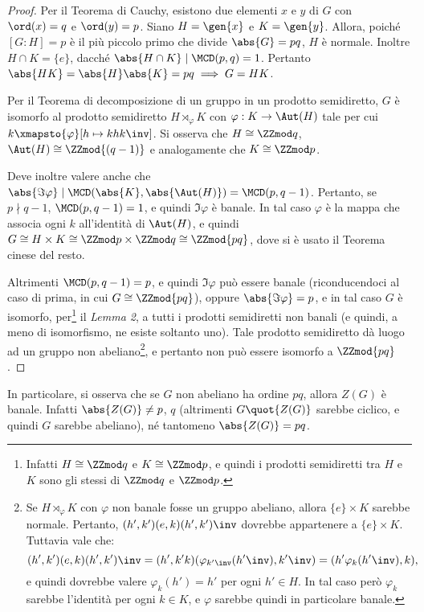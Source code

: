 \documentclass[12pt]{scrartcl}
\begin{document}
	\begin{proof}
		Per il Teorema di Cauchy, esistono due elementi $x$ e $y$ di $G$ con $\ord(x)=q$
		e $\ord(y)=p$. Siano $H = \gen{x}$ e $K = \gen{y}$. Allora, poiché $[G : H] = p$
		è il più piccolo primo che divide $\abs{G} = pq$, $H$ è normale. Inoltre
		$H \cap K = \{e\}$, dacché $\abs{H \cap K} \mid \MCD(p, q) = 1$. Pertanto
		$\abs{HK} = \abs{H} \abs{K} = pq \implies G = HK$. \medskip
		
		
		Per il Teorema di decomposizione di un gruppo in un prodotto semidiretto,
		$G$ è isomorfo al prodotto semidiretto $H \rtimes_\varphi K$ con
		$\varphi : K \to \Aut(H)$ tale per cui $k \xmapsto{\varphi} [h \mapsto k h k\inv]$.
		Si osserva che $H \cong \ZZmod q$, $\Aut(H) \cong \ZZmod{(q-1)}$ e analogamente che
		$K \cong \ZZmod p$. \medskip
		
		
		Deve inoltre valere anche che $\abs{\Im \varphi} \mid \MCD(\abs{K},
		\abs{\Aut(H)}) = \MCD(p, q-1)$. Pertanto, se $p \nmid q-1$, $\MCD(p, q-1) = 1$,
		e quindi $\Im \varphi$ è banale. In tal caso $\varphi$ è la mappa che associa
		ogni $k$ all'identità di $\Aut(H)$, e quindi $G \cong H \times K \cong \ZZmod p \times \ZZmod q \cong \ZZmod{pq}$, dove si è usato il Teorema cinese del resto. \medskip
		
		
		Altrimenti $\MCD(p, q-1) = p$, e quindi $\Im \varphi$ può essere banale (riconducendoci
		al caso di prima, in cui $G \cong \ZZmod{pq}$), oppure $\abs{\Im \varphi} = p$, e in tal caso $G$ è isomorfo,
		per\footnote{
			Infatti $H \cong \ZZmod q$ e $K \cong \ZZmod p$, e
			quindi i prodotti semidiretti tra $H$ e $K$
			sono gli stessi di $\ZZmod q$ e $\ZZmod p$.
		} il \textit{Lemma 2}, a tutti i prodotti semidiretti
		non banali (e quindi, a meno di isomorfismo, ne esiste
		soltanto uno). Tale prodotto semidiretto dà luogo ad
		un gruppo non abeliano\footnote{
			Se $H \rtimes_\varphi K$ con
			$\varphi$ non banale fosse un gruppo abeliano, allora
			$\{e\} \times K$ sarebbe normale. Pertanto,
			$(h',k')(e,k)(h',k')\inv$ dovrebbe appartenere
			a $\{e\} \times K$. Tuttavia vale che:
			\[ (h',k')(e,k)(h',k')\inv =
				(h', k' k)(\varphi_{{k'}\inv}({h'}\inv), {k'}\inv) =
				(h' \varphi_{k}({h'}\inv), k), \]
			e quindi dovrebbe valere $\varphi_k(h') = h'$
			per ogni $h' \in H$. In tal caso però
			$\varphi_k$ sarebbe l'identità per ogni $k \in K$,
			e $\varphi$ sarebbe quindi in particolare banale.
		}, e pertanto non può essere
		isomorfo a $\ZZmod{pq}$.
	\end{proof}
	
	In particolare, si osserva che se $G$ non abeliano ha ordine $pq$,
	allora $Z(G)$ è banale. Infatti $\abs{Z(G)} \neq p$, $q$
	(altrimenti $G \quot{Z(G)}$ sarebbe ciclico, e quindi
	$G$ sarebbe abeliano), né tantomeno $\abs{Z(G)} = pq$.
	
\end{document}
